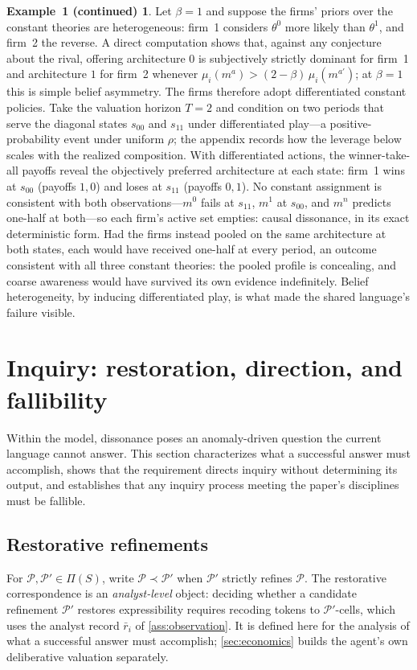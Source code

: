 \documentclass[11pt]{article}
\theoremstyle{definition}
\newtheorem*{excont}{Example~1 (continued)}
\begin{document}
\begin{excont}
Let $\beta=1$ and suppose the firms' priors over the constant theories are heterogeneous: firm~1 considers $\theta^0$ more likely than $\theta^1$, and firm~2 the reverse.
A direct computation shows that, against any conjecture about the rival, offering architecture $0$ is subjectively strictly dominant for firm~1 and architecture $1$ for firm~2 whenever $\mu_i(m^a)>(2-\beta)\,\mu_i(m^{a'})$; at $\beta=1$ this is simple belief asymmetry.
The firms therefore adopt differentiated constant policies.
Take the valuation horizon $T=2$ and condition on two periods that serve the diagonal states $s_{00}$ and $s_{11}$ under differentiated play---a positive-probability event under uniform $\rho$; the appendix records how the leverage below scales with the realized composition.
With differentiated actions, the winner-take-all payoffs reveal the objectively preferred architecture at each state: firm~1 wins at $s_{00}$ (payoffs $1,0$) and loses at $s_{11}$ (payoffs $0,1$).
No constant assignment is consistent with both observations---$m^0$ fails at $s_{11}$, $m^1$ at $s_{00}$, and $m^n$ predicts one-half at both---so each firm's active set empties: causal dissonance, in its exact deterministic form.
Had the firms instead pooled on the same architecture at both states, each would have received one-half at every period, an outcome consistent with all three constant theories: the pooled profile is concealing, and coarse awareness would have survived its own evidence indefinitely.
Belief heterogeneity, by inducing differentiated play, is what made the shared language's failure visible.
\end{excont}
\section{Inquiry: restoration, direction, and fallibility}
\label{sec:inquiry}

Within the model, dissonance poses an anomaly-driven question the current language cannot answer.
This section characterizes what a successful answer must accomplish, shows that the requirement directs inquiry without determining its output, and establishes that any inquiry process meeting the paper's disciplines must be fallible.

\subsection{Restorative refinements}

For $\mathcal P,\mathcal P'\in\Pi(S)$, write $\mathcal P\prec\mathcal P'$ when $\mathcal P'$ strictly refines $\mathcal P$.
The restorative correspondence is an \emph{analyst-level} object: deciding whether a candidate refinement $\mathcal P'$ restores expressibility requires recoding tokens to $\mathcal P'$-cells, which uses the analyst record $\bar r_i$ of \cref{ass:observation}.
It is defined here for the analysis of what a successful answer must accomplish; \cref{sec:economics} builds the agent's own deliberative valuation separately.
\end{document}
